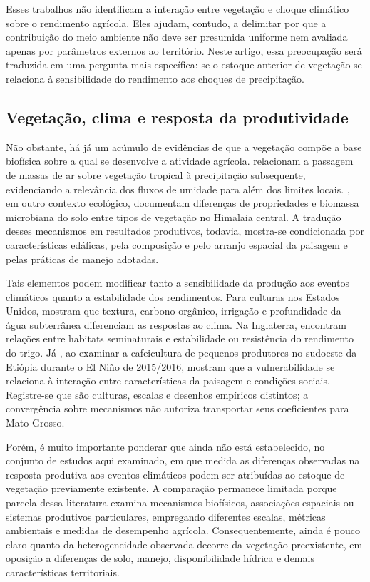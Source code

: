 Esses trabalhos não identificam a interação entre vegetação e choque climático sobre o rendimento agrícola. Eles ajudam, contudo, a delimitar por que a contribuição do meio ambiente não deve ser presumida uniforme nem avaliada apenas por parâmetros externos ao território. Neste artigo, essa preocupação será traduzida em uma pergunta mais específica: se o estoque anterior de vegetação se relaciona à sensibilidade do rendimento aos choques de precipitação.

\subsection{Vegetação, clima e resposta da produtividade}

Não obstante, há já um acúmulo de evidências de que a vegetação compõe a base biofísica sobre a qual se desenvolve a atividade agrícola.  relacionam a passagem de massas de ar sobre vegetação tropical à precipitação subsequente, evidenciando a relevância dos fluxos de umidade para além dos limites locais. , em outro contexto ecológico, documentam diferenças de propriedades e biomassa microbiana do solo entre tipos de vegetação no Himalaia central. A tradução desses mecanismos em resultados produtivos, todavia, mostra-se condicionada por características edáficas, pela composição e pelo arranjo espacial da paisagem e pelas práticas de manejo adotadas.

Tais elementos podem modificar tanto a sensibilidade da produção aos eventos climáticos quanto a estabilidade dos rendimentos. Para culturas nos Estados Unidos,  mostram que textura, carbono orgânico, irrigação e profundidade da água subterrânea diferenciam as respostas ao clima. Na Inglaterra,  encontram relações entre habitats seminaturais e estabilidade ou resistência do rendimento do trigo. Já , ao examinar a cafeicultura de pequenos produtores no sudoeste da Etiópia durante o El Niño de 2015/2016, mostram que a vulnerabilidade se relaciona à interação entre características da paisagem e condições sociais. Registre-se que são culturas, escalas e desenhos empíricos distintos; a convergência sobre mecanismos não autoriza transportar seus coeficientes para Mato Grosso.

Porém, é muito importante ponderar que ainda não está estabelecido, no conjunto de estudos aqui examinado, em que medida as diferenças observadas na resposta produtiva aos eventos climáticos podem ser atribuídas ao estoque de vegetação previamente existente. A comparação permanece limitada porque parcela dessa literatura examina mecanismos biofísicos, associações espaciais ou sistemas produtivos particulares, empregando diferentes escalas, métricas ambientais e medidas de desempenho agrícola. Consequentemente, ainda é pouco claro quanto da heterogeneidade observada decorre da vegetação preexistente, em oposição a diferenças de solo, manejo, disponibilidade hídrica e demais características territoriais.

